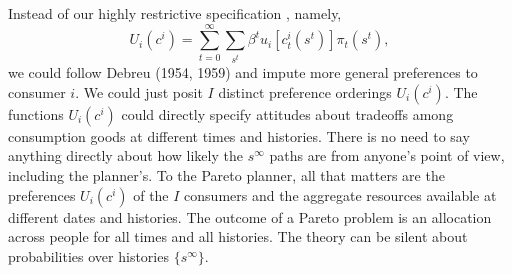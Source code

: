 %
 Instead of our highly restrictive specification  %
 , namely,
 $$U_i(c^i) =
   \sum_{t=0}^\infty \sum_{s^t} \beta^t u_i[c_t^i(s^t)]
   \pi_t(s^t),$$
we could follow
  Debreu (1954, 1959)  and impute  more  general preferences to
consumer $i$.    We %
could just posit $I$  distinct   preference orderings   $U_i(c^i)$.
The functions
$U_i(c^i)$ could   directly specify attitudes about  tradeoffs among consumption goods at different times and histories.
There is no need to say anything directly about how likely the $s^\infty$ paths are from  anyone's  point of view, including the planner's.
To the Pareto planner, all that matters are  the preferences $U_i(c^i)$ of the $I$ consumers and the aggregate resources available at different dates and histories.
The outcome of a Pareto problem is an allocation  across people
for all times and all histories.  %
The theory   can be silent about probabilities over histories $\{s^\infty\}$.



